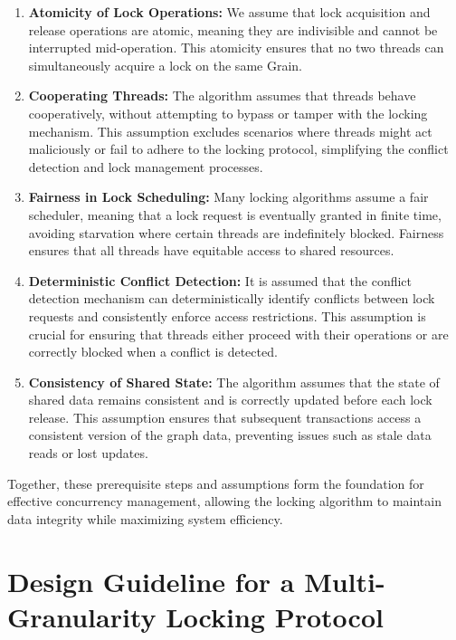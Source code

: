 \begin{enumerate}
    \item \textbf{Atomicity of Lock Operations:} We assume that lock acquisition and release operations are atomic, meaning they are indivisible and cannot be interrupted mid-operation. This atomicity ensures that no two threads can simultaneously acquire a lock on the same Grain.

    \item \textbf{Cooperating Threads:} The algorithm assumes that threads behave cooperatively, without attempting to bypass or tamper with the locking mechanism. This assumption excludes scenarios where threads might act maliciously or fail to adhere to the locking protocol, simplifying the conflict detection and lock management processes.
    
    \item  \textbf{Fairness in Lock Scheduling:} Many locking algorithms assume a fair scheduler, meaning that a lock request is eventually granted in finite time, avoiding starvation where certain threads are indefinitely blocked. Fairness ensures that all threads have equitable access to shared resources.

    \item \textbf{Deterministic Conflict Detection:}  It is assumed that the conflict detection mechanism can deterministically identify conflicts between lock requests and consistently enforce access restrictions. This assumption is crucial for ensuring that threads either proceed with their operations or are correctly blocked when a conflict is detected.
    
    \item \textbf{Consistency of Shared State:} The algorithm assumes that the state of shared data remains consistent and is correctly updated before each lock release. This assumption ensures that subsequent transactions access a consistent version of the graph data, preventing issues such as stale data reads or lost updates.
\end{enumerate}


Together, these prerequisite steps and assumptions form the foundation for effective concurrency management, allowing the locking algorithm to maintain data integrity while maximizing system efficiency.



\section{Design Guideline for a Multi-Granularity Locking Protocol} \label{sec:requirements}

